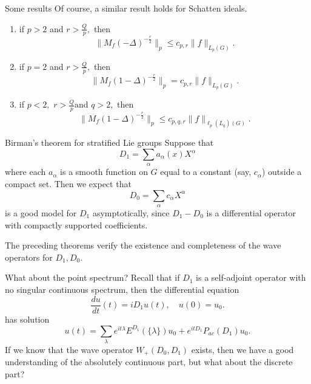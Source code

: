 \documentclass{beamer}
\numberwithin{equation}{section}
\theoremstyle{plain}
\theoremstyle{plain}
\theoremstyle{definition}
\theoremstyle{plain}
\theoremstyle{plain}
\theoremstyle{definition}
\begin{document}
\begin{frame}{Some results}
Of course, a similar result holds for Schatten ideals.

\begin{theorem}\label{cwikel schatten_theorem}
\begin{enumerate}[{\rm (i)}]
\item if $p>2$ and $r>\frac{Q}{p},$ then
$$\|M_f(-\Delta)^{-\frac{r}{2}}\|_p\leq c_{p,r}\|f\|_{L_p(G)}.$$
\item if $p=2$ and $r>\frac{Q}{p},$ then
$$\|M_f(1-\Delta)^{-\frac{r}{2}}\|_p=c_{p,r}\|f\|_{L_p(G)}.$$
\item if $p<2,$ $r>\frac{Q}{p}$and $q>2,$ then
$$\|M_f(1-\Delta)^{-\frac{r}{2}}\|_p\leq c_{p,q,r}\|f\|_{\ell_p(L_q)(G)}.$$
\end{enumerate}
\end{theorem}
\end{frame}


\begin{frame}{Birman's theorem for stratified Lie groups}
  Suppose that
  \[
      D_1 = \sum_{\alpha} a_{\alpha}(x)X^{\alpha}
  \]
  where each $a_{\alpha}$ is a smooth function on $G$ equal to a constant (say, $c_{\alpha}$) outside a compact set.
  Then we expect that
  \[
      D_0 = \sum_{\alpha} c_{\alpha}X^{\alpha}
  \]
  is a good model for $D_1$ asymptotically, since $D_1-D_0$ is a differential operator with compactly supported coefficients.

  The preceding theorems verify the existence and completeness of the wave operators for $D_1,D_0.$
\end{frame}

\begin{frame}{What about the point spectrum?}
Recall that if $D_1$ is a self-adjoint operator with no singular continuous spectrum, then the differential equation
  \[
    \frac{du}{dt}(t) = iD_1u(t),\quad u(0) = u_0.
  \]
  has solution
  \[
    u(t) = \sum_{\lambda} e^{it\lambda}E^{D_1}(\{\lambda\})u_0 + e^{itD_1}P_{ac}(D_1)u_0.
  \]
  If we know that the wave operator $W_+(D_0,D_1)$ exists, then we have a good understanding of the absolutely continuous part, but what about the discrete part?
\end{frame}
\end{document}
